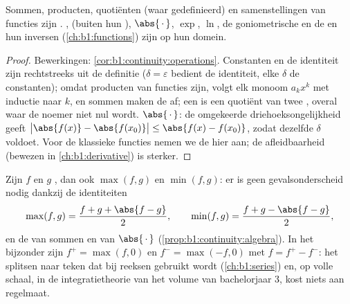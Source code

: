 \begin{proposition}\label{prop:b1:continuity:algebra}
Sommen, producten, quotiënten (waar gedefinieerd) en samenstellingen van
 functies zijn . ,  (buiten hun
), $\abs{\,\cdot\,}$, $\exp$, $\ln$, de goniometrische en de
 en hun inversen (\cref{ch:b1:functions}) zijn
 op hun domein.
\end{proposition}

\begin{proof}
Bewerkingen: \cref{cor:b1:continuity:operations}. Constanten en de
identiteit zijn rechtstreeks uit de definitie  ($\delta =
\varepsilon$ bedient de identiteit, elke $\delta$ de constanten); omdat
producten van  functies  zijn, volgt elk monoom $a_k x^k$
met inductie naar $k$, en sommen maken de  af; een  is een quotiënt van twee ,  overal waar de noemer
niet nul wordt. $\abs{\,\cdot\,}$: de omgekeerde driehoeksongelijkheid
geeft $\bigl|\abs{f(x)} - \abs{f(x_0)}\bigr| \leq \abs{f(x) - f(x_0)}$,
zodat dezelfde $\delta$ voldoet. Voor de klassieke functies nemen we de
 hier aan; de afleidbaarheid (bewezen in
\cref{ch:b1:derivative}) is sterker.
\end{proof}

\begin{example}\label{ex:b1:continuity:maxmin}
Zijn $f$ en $g$ , dan ook $\max(f, g)$ en $\min(f, g)$: er is geen
gevalsonderscheid nodig dankzij de identiteiten
\[
\max(f, g) = \frac{f + g + \abs{f - g}}{2},
\qquad
\min(f, g) = \frac{f + g - \abs{f - g}}{2},
\]
en de  van sommen en van $\abs{\,\cdot\,}$
(\cref{prop:b1:continuity:algebra}). In het bijzonder zijn $f^+ = \max(f,
0)$ en $f^- = \max(-f, 0)$  met $f = f^+ - f^-$: het splitsen naar
teken dat bij reeksen gebruikt wordt (\cref{ch:b1:series}) en, op volle
schaal, in de integratietheorie van het volume van bachelorjaar 3, kost
niets aan regelmaat.
\end{example}

